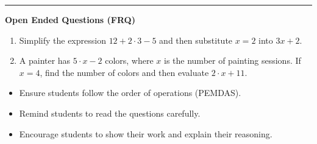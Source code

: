 \documentclass[10pt]{article}
\begin{document}
\vspace{-0.2cm}
\hrule
\vspace{0.2cm}
\textbf{\small Open Ended Questions (FRQ)}
\begin{enumerate}[label=\textbf{Q\arabic*.}, start=9, itemsep=5pt, topsep=0pt]

  \item \small Simplify the expression $12 + 2 \cdot 3 - 5$ and then substitute $x = 2$ into $3x + 2$. \vspace{2cm}

  \item \small A painter has $5 \cdot x - 2$ colors, where $x$ is the number of painting sessions. If $x = 4$, find the number of colors and then evaluate $2 \cdot x + 11$. \vspace{2cm}

\end{enumerate}

\vfill

\begin{tcolorbox}[colback=blue!5, colframe=mainblue!50, title=\small \textbf{Chef's Tips}, fonttitle=\bfseries, bottom=1mm]
\begin{itemize}[noitemsep, topsep=2pt, leftmargin=0.5cm]
  \item \scriptsize Ensure students follow the order of operations (PEMDAS).\item \scriptsize Remind students to read the questions carefully.\item \scriptsize Encourage students to show their work and explain their reasoning.
\end{itemize}
\end{tcolorbox}
\end{document}
